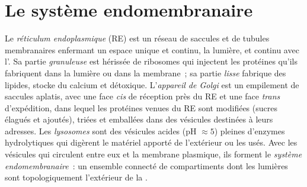 \section{Le système endomembranaire}

\begin{definition}\label{def:b1:eukaryotic-cell:endomembrane}
Le \emph{réticulum endoplasmique} (RE)
est un réseau de saccules et de tubules membranaires enfermant un espace
unique et continu, la lumière, et continu avec l'. Sa
partie \emph{granuleuse} est
hérissée de ribosomes qui injectent les protéines qu'ils fabriquent dans
la lumière ou dans la membrane~; sa partie
\emph{lisse} fabrique des lipides,
stocke du calcium et détoxique. L'\emph{appareil de
Golgi} est un empilement de saccules aplatis,
avec une face \emph{cis} de réception près du RE et une face
\emph{trans} d'expédition, dans lequel les protéines venues du RE sont
modifiées (sucres élagués et ajoutés), triées et emballées dans des
vésicules destinées à leurs adresses. Les
\emph{lysosomes} sont des vésicules acides (pH
$\approx 5$) pleines d'enzymes hydrolytiques qui digèrent le matériel
apporté de l'extérieur ou les  usés. Avec les vésicules qui
circulent entre eux et la membrane plasmique, ils forment le
\emph{système endomembranaire}~: un
ensemble connecté de compartiments dont les lumières sont
topologiquement l'extérieur de la .
\end{definition}

